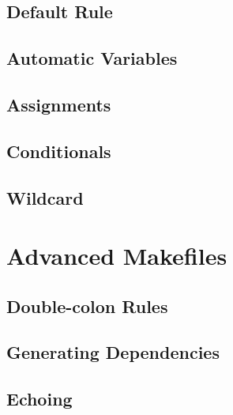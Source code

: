 \subsection{Default Rule}


\subsection{Automatic Variables}


\subsection{Assignments}


\subsection{Conditionals}


\subsection{Wildcard}


%
%

\section{Advanced Makefiles}

\subsection{Double-colon Rules}


\subsection{Generating Dependencies}


\subsection{Echoing}

